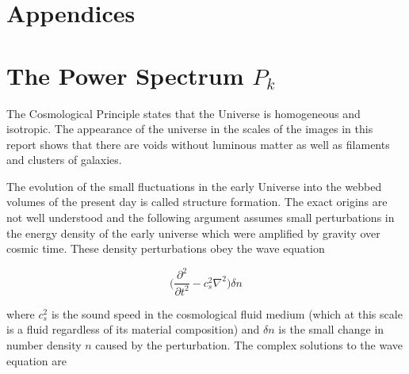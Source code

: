 \documentclass[twocolumn]{article}
\numberwithin{equation}{section}
\begin{document}
\setcounter{section}{0}
\section*{Appendices}

%
\appendix


\section{The Power Spectrum $P_k$}\label{appendix:power_spectrum} 
The Cosmological Principle states that the Universe is homogeneous and isotropic. The appearance of the universe in the 
scales of the images in this report shows that there are voids without luminous matter as well as filaments and clusters 
of galaxies.


The evolution of the small fluctuations in the early Universe into the webbed volumes of the present day is called 
structure formation. The exact origins are not well understood and the following argument assumes small perturbations 
in the energy density of the early universe which were amplified by gravity over cosmic time. These density perturbations
obey the wave equation 

\begin{equation}
    \bigg ( \frac{\partial^2}{\partial t^2} - c_s^2\nabla^2\bigg )\delta n
\end{equation}

where $c_s^2$ is the sound speed in the cosmological fluid medium (which at this scale is a fluid regardless of its 
material composition) and $\delta n$ is the small change in number density $n$ caused by the perturbation. The complex
solutions to the wave equation are 
\end{document}
